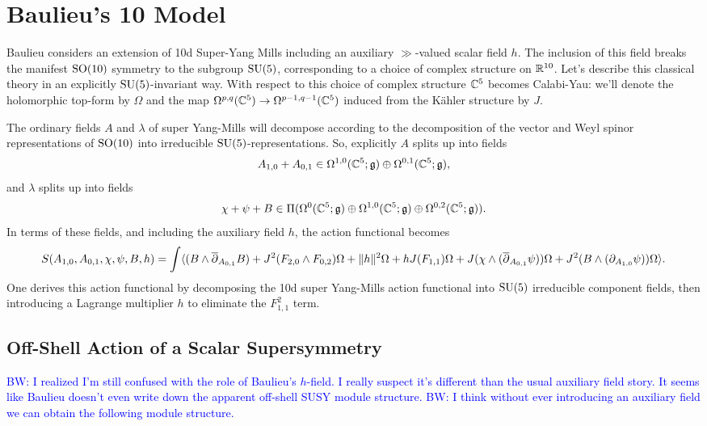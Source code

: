 \documentclass[10pt, oneside]{article}
\def\brian{\textcolor{blue}{BW: }\textcolor{blue}}
\begin{document}

\section{Baulieu's 10 Model}

Baulieu \cite{Baulieu} considers an extension of 10d Super-Yang Mills including an auxiliary $\gg$-valued scalar field $h$.  The inclusion of this field breaks the manifest $\mathrm{SO}(10)$ symmetry to the subgroup $\mathrm{SU}(5)$, corresponding to a choice of complex structure on $\mathbb{R}^{10}$.  Let's describe this classical theory in an explicitly $\mathrm{SU}(5)$-invariant way.  With respect to this choice of complex structure $\mathbb{C}^5$ becomes Calabi-Yau: we'll denote the holomorphic top-form by $\Omega$ and the map $\Omega^{p,q}(\mathbb{C}^5) \to \Omega^{p-1,q-1}(\mathbb{C}^5)$ induced from the K\"ahler structure by $J$.

The ordinary fields $A$ and $\lambda$ of super Yang-Mills will decompose according to the decomposition of the vector and Weyl spinor representations of $\mathrm{SO}(10)$ into irreducible $\mathrm{SU}(5)$-representations.  So, explicitly $A$ splits up into fields
\[A_{1,0} + A_{0,1} \in \Omega^{1,0}(\mathbb{C}^5; \mathfrak{g}) \oplus \Omega^{0,1}(\mathbb{C}^5; \mathfrak{g}),\]
and $\lambda$ splits up into fields
\[\chi + \psi + B \in \Pi(\Omega^0(\mathbb{C}^5; \mathfrak{g}) \oplus \Omega^{1,0}(\mathbb{C}^5; \mathfrak{g}) \oplus \Omega^{0,2}(\mathbb{C}^5; \mathfrak{g})).\]
In terms of these fields, and including the auxiliary field $h$, the action functional becomes
\[S(A_{1,0}, A_{0,1}, \chi, \psi, B, h) = \int \langle (B \wedge \overline{\partial}_{A_{0,1}} B) + J^2(F_{2, 0}\wedge F_{0,2})\Omega + \|h\|^2\Omega + h J(F_{1,1}) \Omega + J( \chi \wedge (\overline{\partial}_{A_{0,1}} \psi)) \Omega + J^2(B \wedge (\partial_{A_{1,0}} \psi)) \Omega \rangle.\]
One derives this action functional by decomposing the 10d super Yang-Mills action functional into $\mathrm{SU}(5)$ irreducible component fields, then introducing a Lagrange multiplier $h$ to eliminate the $F_{1,1}^2$ term.

\subsection{Off-Shell Action of a Scalar Supersymmetry}

\brian{I realized I'm still confused with the role of Baulieu's $h$-field. 
I really suspect it's different than the usual auxiliary field story. 
It seems like Baulieu doesn't even write down the apparent off-shell SUSY module structure. 
}
\brian{I think without ever introducing an auxiliary field we can obtain the following module structure.}
\end{document}
